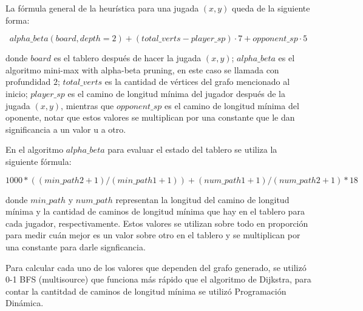 \documentclass[11pt]{article}
\begin{document}
La fórmula general de la heurística para una jugada $(x, y)$ queda de la siguiente forma:

$$alpha\_beta(board, depth=2) + (total\_verts - player\_sp) \cdot 7 + opponent\_sp \cdot 5$$

donde $board$ es el tablero después de hacer la jugada $(x, y)$; $alpha\_beta$ es el algoritmo mini-max with alpha-beta pruning, en este caso se llamada con profundidad $2$; $total\_verts$ es la cantidad de vértices del grafo mencionado al inicio; $player\_sp$ es el camino de longitud mínima del jugador después de la jugada $(x, y)$, mientras que $opponent\_sp$ es el camino de longitud mínima del oponente, notar que estos valores se multiplican por una constante que le dan significancia a un valor u a otro. 

En el algoritmo $alpha\_beta$ para evaluar el estado del tablero se utiliza la siguiente fórmula:

$$1000 * ((min\_path2 + 1) / (min\_path1 + 1)) + (num\_path1 + 1) / (num\_path2 + 1) * 18$$

donde $min\_path$ y $num\_path$ representan la longitud del camino de longitud mínima y la cantidad de caminos de longitud mínima que hay en el tablero para cada jugador, respectivamente. Estos valores se utilizan sobre todo en proporción para medir cuán mejor es un valor sobre otro en el tablero y se multiplican por una constante para darle signficancia.

Para calcular cada uno de los valores que dependen del grafo generado, se utilizó 0-1 BFS (multisource) que funciona más rápido que el algoritmo de Dijkstra, para contar la cantitdad de caminos de longitud mínima se utilizó Programación Dinámica.
\end{document}
